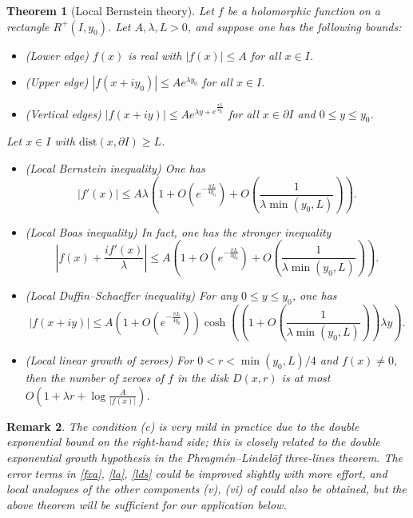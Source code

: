 \documentclass[12pt]{amsart}
\newtheorem{theorem}{Theorem}[section]
\newtheorem{remark}[theorem]{Remark}
\begin{document}
\begin{theorem}[Local Bernstein theory]\label{main-2}  Let $f$ be a holomorphic function on a rectangle $R^+(I,y_0)$.  Let $A, \lambda, L > 0$, and suppose one has the following bounds:
\begin{itemize}
\item[(a)] (Lower edge) $f(x)$ is real with $|f(x)| \leq A$ for all $x \in I$.
\item[(b)] (Upper edge) $|f(x+iy_0)| \leq A e^{\lambda y_0}$ for all $x \in I$.
\item[(c)] (Vertical edges) $|f(x+iy)| \leq A e^{\lambda y + e^{\frac{\pi L}{4y_0}}}$ for all $x \in \partial I$ and $0 \leq y \leq y_0$.
\end{itemize}
Let $x \in I$ with $\mathrm{dist}(x, \partial I) \geq L$.
\begin{itemize}
\item[(i)]  (Local Bernstein inequality)  One has
\begin{equation}\label{fxa}
 |f'(x)| \leq A \lambda \left( 1 + O( e^{-\frac{\pi L}{4y_0}}) + O\left(\frac{1}{\lambda \min(y_0,L)}\right) \right).
\end{equation}
\item[(ii)]  (Local Boas inequality)  In fact, one has the stronger inequality
\begin{equation}\label{la}
 \left|f(x) + \frac{i f'(x)}{\lambda}\right| \leq A \left( 1 + O\left( e^{-\frac{\pi L}{4y_0}}\right) + O\left(\frac{1}{\lambda \min(y_0,L)}\right) \right).
\end{equation}
\item[(iii)]  (Local Duffin--Schaeffer inequality) For any $0 \leq y \leq y_0$, one has
\begin{equation}\label{lds}
 |f(x+iy)| \leq A \left( 1 + O( e^{-\frac{\pi L}{4y_0}}) \right) \cosh \left( \left( 1 + O\left(\frac{1}{\lambda \min(y_0,L)}\right) \right) \lambda y \right).
\end{equation}
\item[(iv)]  (Local linear growth of zeroes) For $0 < r < \min(y_0,L)/4$ and $f(x) \neq 0$, then the number of zeroes of $f$ in the disk $D(x,r)$ is at most $O( 1 + \lambda r + \log \frac{A}{|f(x)|})$.
\end{itemize}
\end{theorem}

\begin{remark}
The condition (c) is very mild in practice due to the double exponential bound on the right-hand side; this is closely related to the double exponential growth hypothesis in the Phragm\'en--Lindel\"of three-lines theorem.  The error terms in \eqref{fxa}, \eqref{la}, \eqref{lds} could be improved slightly with more effort, and local analogues of the other components (v), (vi) of  could also be obtained, but the above theorem will be sufficient for our application below.
\end{remark}
\end{document}
